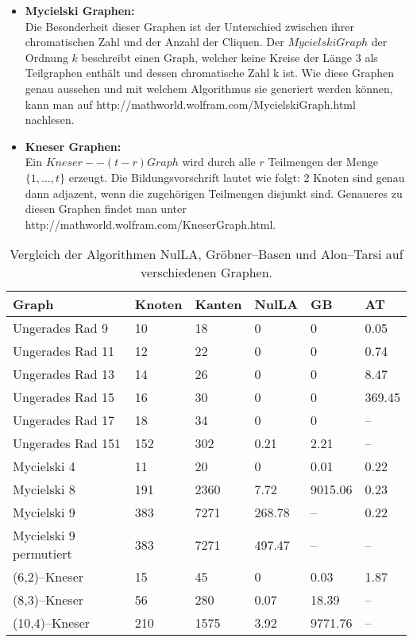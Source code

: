 \begin{itemize}
\item \textbf{Mycielski Graphen: }\\
Die Besonderheit dieser Graphen ist der Unterschied zwischen ihrer chromatischen Zahl und der Anzahl der Cliquen. Der $Mycielski Graph$ der Ordnung $k$ beschreibt einen Graph, welcher keine Kreise der Länge 3 als Teilgraphen enthält und dessen chromatische Zahl k ist. Wie diese Graphen genau aussehen und mit welchem Algorithmus sie generiert werden können, kann man auf http://mathworld.wolfram.com/MycielskiGraph.html nachlesen.
\item \textbf{Kneser Graphen: }\\
Ein $Kneser--(t-r) Graph$ wird durch alle $r$ Teilmengen der Menge $\{1,\ldots,t\}$ erzeugt. Die Bildungsvorschrift lautet wie folgt: 2 Knoten sind genau dann adjazent, wenn die zugehörigen Teilmengen disjunkt sind. Genaueres zu diesen Graphen findet man unter http://mathworld.wolfram.com/KneserGraph.html.
\end{itemize}

\begin{table} [h]
\begin{tabular}{|l|l|l|l|l|l|}
\hline Graph & Knoten & Kanten & NulLA & GB & AT \\
\hline Ungerades Rad 9 & 10 & 18 & 0 & 0 & 0.05 \\
\hline Ungerades Rad 11 & 12 & 22 & 0 & 0 & 0.74 \\
\hline Ungerades Rad 13 & 14 & 26 & 0 & 0 & 8.47 \\
\hline Ungerades Rad 15 & 16 & 30 & 0 & 0 & 369.45 \\
\hline Ungerades Rad 17 & 18 & 34 & 0 & 0 & -- \\
\hline Ungerades Rad 151 & 152 & 302 & 0.21 & 2.21 & -- \\
\hline Mycielski 4 & 11 & 20 & 0 & 0.01 & 0.22 \\
\hline Mycielski 8 & 191 & 2360 & 7.72 & 9015.06 & 0.23 \\
\hline Mycielski 9 & 383 & 7271 & 268.78 & -- & 0.22 \\
\hline Mycielski 9 permutiert & 383 & 7271 & 497.47 & -- & -- \\
\hline (6,2)--Kneser & 15 & 45 & 0 & 0.03 & 1.87 \\
\hline (8,3)--Kneser & 56 & 280 & 0.07 & 18.39 & -- \\
\hline (10,4)--Kneser & 210 & 1575 & 3.92 & 9771.76 & -- \\
\hline
\end{tabular}
\caption{Vergleich der Algorithmen NulLA, Gröbner--Basen und Alon--Tarsi auf verschiedenen Graphen.}
\end{table}

